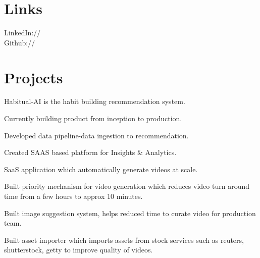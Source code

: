 \documentclass[]{deedy-resume-openfont}
\begin{document}
\begin{minipage}[t]{0.33\textwidth}

\section{Links} 
LinkedIn://  \href{https://www.linkedin.com/in/rohan-pithadiya}{} \\
Github:// \href{https://github.com/Rohanpithadiya}{} \\
\sectionsep

%
%

\end{minipage} 
\hfill
\begin{minipage}[t]{0.65\textwidth} 


\section{Projects}
\location{}
\vspace{\topsep} %
\begin{tightemize}
\item Habitual-AI is the habit building recommendation system.
\item Currently building product from inception to production.
\item Developed data pipeline-data ingestion to recommendation.
\item Created SAAS based platform for Insights \& Analytics.
\end{tightemize}
\sectionsep

\location{}
\begin{tightemize}
\item  SaaS application which automatically generate videos at scale.
\item Built priority mechanism for video generation which reduces video turn around time from a few hours to approx 10 minutes.
\item Built image suggestion system, helps reduced time to curate video for production team.
\item Built asset importer which imports assets from stock services such as reuters, shutterstock, getty to improve quality of videos.
\end{tightemize}
\sectionsep


\end{minipage}
\end{document}
